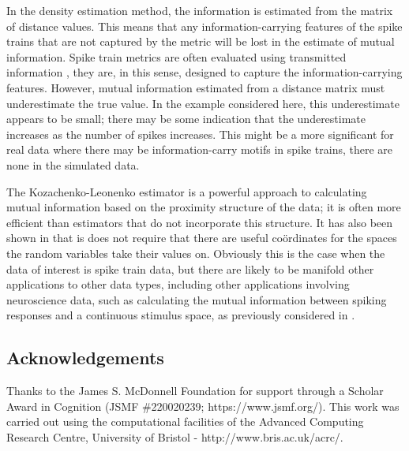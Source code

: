 \documentclass[12pt]{article}
\begin{document}
In the density estimation method, the information is estimated from
the matrix of distance values. This means that any
information-carrying features of the spike trains that are not
captured by the metric will be lost in the estimate of mutual
information. Spike train metrics are often evaluated using transmitted
information \citep{VictorPurpura1996,HoughtonVictor2010}, they are, in
this sense, designed to capture the information-carrying
features. However, mutual information estimated from a distance matrix
must underestimate the true value. In the example considered here,
this underestimate appears to be small; there may be some indication
that the underestimate increases as the number of spikes
increases. This might be a more significant for real data where there
may be information-carry motifs in spike trains, there are none in
the simulated data. 

The Kozachenko-Leonenko estimator is a powerful approach to
calculating mutual information based on the proximity structure of the
data; it is often more efficient than estimators that do not
incorporate this structure. It has also been shown in
\citet{Houghton2015} that is does not require that there are useful
co\"{o}rdinates for the spaces the random variables take their values
on.  Obviously this is the case when the data of interest is spike
train data, but there are likely to be manifold other applications to
other data types, including other applications involving neuroscience
data, such as calculating the mutual information between spiking
responses and a continuous stimulus space, as previously considered in
\cite{PanzeriEtAl1999}.


\subsection*{Acknowledgements} Thanks to the  James S. McDonnell Foundation for support through a  Scholar Award in Cognition (JSMF \#220020239; https://www.jsmf.org/). This work was carried out using the computational facilities of the Advanced Computing Research Centre, University of Bristol - http://www.bris.ac.uk/acrc/.
\end{document}
